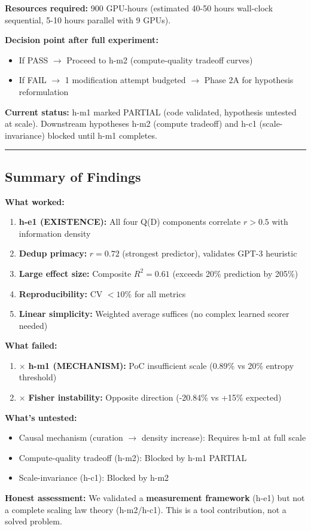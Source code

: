 \textbf{Resources required:} 900 GPU-hours (estimated 40-50 hours wall-clock sequential, 5-10 hours parallel with 9 GPUs).

\textbf{Decision point after full experiment:}
\begin{itemize}
\item If PASS $\rightarrow$ Proceed to h-m2 (compute-quality tradeoff curves)
\item If FAIL $\rightarrow$ 1 modification attempt budgeted $\rightarrow$ Phase 2A for hypothesis reformulation
\end{itemize}

\textbf{Current status:} h-m1 marked PARTIAL (code validated, hypothesis untested at scale). Downstream hypotheses h-m2 (compute tradeoff) and h-c1 (scale-invariance) blocked until h-m1 completes.

\vspace{0.5em}
\noindent\rule{\textwidth}{0.4pt}
\vspace{0.5em}

\subsection{Summary of Findings}

\textbf{What worked:}
\begin{enumerate}
\item \checkmark{} \textbf{h-e1 (EXISTENCE):} All four Q(D) components correlate $r > 0.5$ with information density
\item \checkmark{} \textbf{Dedup primacy:} $r = 0.72$ (strongest predictor), validates GPT-3 heuristic
\item \checkmark{} \textbf{Large effect size:} Composite $R^2 = 0.61$ (exceeds 20\% prediction by 205\%)
\item \checkmark{} \textbf{Reproducibility:} CV $< 10\%$ for all metrics
\item \checkmark{} \textbf{Linear simplicity:} Weighted average suffices (no complex learned scorer needed)
\end{enumerate}

\textbf{What failed:}
\begin{enumerate}
\item $\times$ \textbf{h-m1 (MECHANISM):} PoC insufficient scale (0.89\% vs 20\% entropy threshold)
\item $\times$ \textbf{Fisher instability:} Opposite direction (-20.84\% vs +15\% expected)
\end{enumerate}

\textbf{What's untested:}
\begin{itemize}
\item Causal mechanism (curation $\rightarrow$ density increase): Requires h-m1 at full scale
\item Compute-quality tradeoff (h-m2): Blocked by h-m1 PARTIAL
\item Scale-invariance (h-c1): Blocked by h-m2
\end{itemize}

\textbf{Honest assessment:} We validated a \textbf{measurement framework} (h-e1) but not a complete scaling law theory (h-m2/h-c1). This is a tool contribution, not a solved problem.
